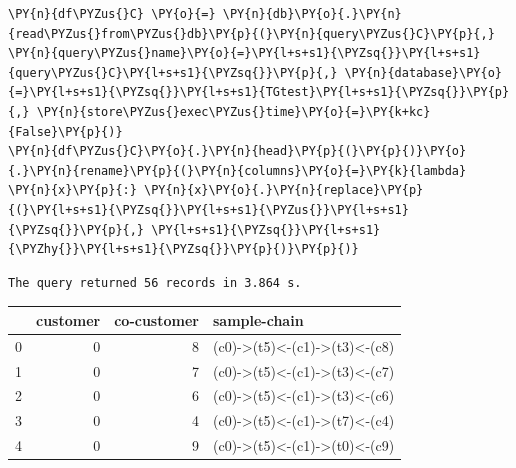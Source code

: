     \begin{tcolorbox}[breakable, size=fbox, boxrule=1pt, pad at break*=1mm,colback=cellbackground, colframe=cellborder]
\begin{Verbatim}[commandchars=\\\{\}]
\PY{n}{df\PYZus{}C} \PY{o}{=} \PY{n}{db}\PY{o}{.}\PY{n}{read\PYZus{}from\PYZus{}db}\PY{p}{(}\PY{n}{query\PYZus{}C}\PY{p}{,} \PY{n}{query\PYZus{}name}\PY{o}{=}\PY{l+s+s1}{\PYZsq{}}\PY{l+s+s1}{query\PYZus{}C}\PY{l+s+s1}{\PYZsq{}}\PY{p}{,} \PY{n}{database}\PY{o}{=}\PY{l+s+s1}{\PYZsq{}}\PY{l+s+s1}{TGtest}\PY{l+s+s1}{\PYZsq{}}\PY{p}{,} \PY{n}{store\PYZus{}exec\PYZus{}time}\PY{o}{=}\PY{k+kc}{False}\PY{p}{)}
\PY{n}{df\PYZus{}C}\PY{o}{.}\PY{n}{head}\PY{p}{(}\PY{p}{)}\PY{o}{.}\PY{n}{rename}\PY{p}{(}\PY{n}{columns}\PY{o}{=}\PY{k}{lambda} \PY{n}{x}\PY{p}{:} \PY{n}{x}\PY{o}{.}\PY{n}{replace}\PY{p}{(}\PY{l+s+s1}{\PYZsq{}}\PY{l+s+s1}{\PYZus{}}\PY{l+s+s1}{\PYZsq{}}\PY{p}{,} \PY{l+s+s1}{\PYZsq{}}\PY{l+s+s1}{\PYZhy{}}\PY{l+s+s1}{\PYZsq{}}\PY{p}{)}\PY{p}{)}
\end{Verbatim}
\end{tcolorbox}

    \begin{Verbatim}[commandchars=\\\{\}]
The query returned 56 records in 3.864 s.
    \end{Verbatim}
 
            
    
    \begin{center}
\begin{tabular}{lrrl}
\toprule
 & customer & co-customer & sample-chain \\
\midrule
0 & 0 & 8 & (c0)->(t5)<-(c1)->(t3)<-(c8) \\
1 & 0 & 7 & (c0)->(t5)<-(c1)->(t3)<-(c7) \\
2 & 0 & 6 & (c0)->(t5)<-(c1)->(t3)<-(c6) \\
3 & 0 & 4 & (c0)->(t5)<-(c1)->(t7)<-(c4) \\
4 & 0 & 9 & (c0)->(t5)<-(c1)->(t0)<-(c9) \\
\bottomrule
\end{tabular}

\end{center}

    

